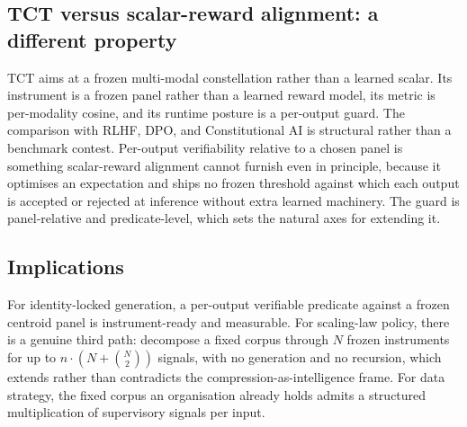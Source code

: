 \documentclass[10pt,twocolumn]{article}
\begin{document}
\subsection{TCT versus scalar-reward alignment: a different property}
\label{sec:tct-vs-scalar}
TCT aims at a frozen multi-modal constellation rather than a learned scalar. Its
instrument is a frozen panel rather than a learned reward model, its metric is
per-modality cosine, and its runtime posture is a per-output guard. The comparison
with RLHF, DPO, and Constitutional AI is structural rather than a benchmark
contest. Per-output verifiability relative to a chosen panel is something
scalar-reward alignment cannot furnish even in principle, because it optimises an
expectation and ships no frozen threshold against which each output is accepted or
rejected at inference without extra learned machinery. The guard is panel-relative
and predicate-level, which sets the natural axes for extending it.

\subsection{Implications}
For identity-locked generation, a per-output verifiable predicate against a frozen
centroid panel is instrument-ready and measurable. For scaling-law policy, there
is a genuine third path: decompose a fixed corpus through $N$ frozen instruments
for up to $n\cdot(N+\binom{N}{2})$ signals, with no generation and no recursion,
which extends rather than contradicts the compression-as-intelligence frame. For
data strategy, the fixed corpus an organisation already holds admits a structured
multiplication of supervisory signals per input.

\end{document}
